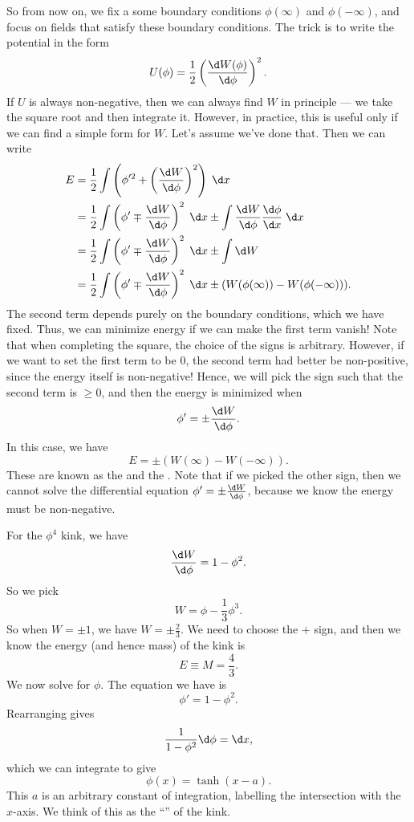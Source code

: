 \documentclass[a4paper]{article}
\begin{document}
So from now on, we fix a some boundary conditions $\phi(\infty)$ and $\phi(-\infty)$, and focus on fields that satisfy these boundary conditions. The trick is to write the potential in the form
\[
  U (\phi) = \frac{1}{2} \left(\frac{\d W (\phi)}{\d \phi}\right)^2.
\]
If $U$ is always non-negative, then we can always find $W$ in principle --- we take the square root and then integrate it. However, in practice, this is useful only if we can find a simple form for $W$. Let's assume we've done that. Then we can write
\begin{align*}
  E &= \frac{1}{2} \int \left(\phi'^2 + \left(\frac{\d W}{\d \phi}\right)^2 \right)\;\d x\\
  &= \frac{1}{2} \int \left(\phi' \mp \frac{\d W}{\d \phi}\right)^2\;\d x \pm \int \frac{\d W}{\d \phi} \frac{\d \phi}{\d x} \;\d x\\
  &= \frac{1}{2} \int \left(\phi' \mp \frac{\d W}{\d \phi}\right)^2\;\d x \pm \int \d W\\
  &= \frac{1}{2} \int \left(\phi' \mp \frac{\d W}{\d \phi}\right)^2\;\d x \pm (W(\phi(\infty)) - W(\phi(-\infty))).
\end{align*}
The second term depends purely on the boundary conditions, which we have fixed. Thus, we can minimize energy if we can make the first term vanish! Note that when completing the square, the choice of the signs is arbitrary. However, if we want to set the first term to be $0$, the second term had better be non-positive, since the energy itself is non-negative! Hence, we will pick the sign such that the second term is $\geq 0$, and then the energy is minimized when
\[
  \phi' = \pm \frac{\d W}{\d \phi}.
\]
In this case, we have
\[
  E = \pm (W(\infty) - W(-\infty)).
\]
These are known as the  and the . Note that if we picked the other sign, then we cannot solve the differential equation $\phi' = \pm \frac{\d W}{\d \phi}$, because we know the energy must be non-negative.

For the $\phi^4$ kink, we have
\[
  \frac{\d W}{\d \phi} = 1 - \phi^2.
\]
So we pick
\[
  W = \phi - \frac{1}{3} \phi^3.
\]
So when $W = \pm 1$, we have $W = \pm \frac{2}{3}$. We need to choose the $+$ sign, and then we know the energy (and hence mass) of the kink is
\[
  E \equiv M = \frac{4}{3}.
\]
We now solve for $\phi$. The equation we have is
\[
  \phi' = 1 - \phi^2.
\]
Rearranging gives
\[
  \frac{1}{1 - \phi^2} \d \phi = \d x,
\]
which we can integrate to give
\[
  \phi (x) = \tanh (x - a).
\]
This $a$ is an arbitrary constant of integration, labelling the intersection with the $x$-axis. We think of this as the ``'' of the kink.
\end{document}
